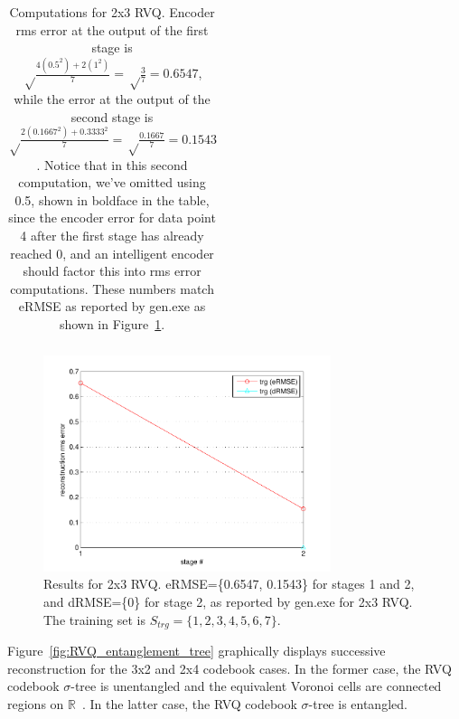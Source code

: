 \begin{table}[t]
\begin{tabular}{|l||c|c|c|c|c|c|c|}
\end{tabular}
\caption{Computations for 2x3 RVQ.  Encoder rms error at the output of the first stage is {\color{blue}$\sqrt \frac{4(0.5^2) + 2(1^2)}{7} = \sqrt\frac{3}{7} = 0.6547$}, while the error at the output of the second stage is {\color{darkgreen}$\sqrt \frac{2(0.1667^2) + 0.3333^2}{7} = \sqrt\frac{0.1667}{7} = 0.1543$}.  Notice that in this second computation, we've omitted using 0.5, shown in boldface in the table, since the encoder error for data point 4 after the first stage has already reached 0, and an intelligent encoder should factor this into rms error computations.  These numbers match eRMSE as reported by gen.exe as shown in Figure~\ref{fig:RVQ_8x3_trg_1_to_7}.}
\label{table:Exp1_detailed_computations}
\end{table}
\clearpage

							\begin{figure}
							\centering
							\includegraphics[width=0.75\textwidth]{thesis2/RVQ_8x3_trg_1_to_7.pdf}
							\caption{Results for 2x3 RVQ.  eRMSE=\{0.6547, 0.1543\} for stages 1 and 2, and dRMSE=\{0\} for stage 2, as reported by gen.exe for 2x3 RVQ.  The training set is $S_{trg}=\{1,2,3,4,5,6,7\}$.}
							\label{fig:RVQ_8x3_trg_1_to_7}
							\end{figure}

Figure~\ref{fig:RVQ_entanglement_tree} graphically displays successive reconstruction for the 3x2 and 2x4 codebook cases.  In the former case, the RVQ codebook $\sigma$-tree is unentangled and the equivalent Voronoi cells are connected regions on $\mathbb{R}$~\cite{1993_JNL_RVQDSC_Barnes}.  In the latter case, the RVQ codebook $\sigma$-tree is entangled.


